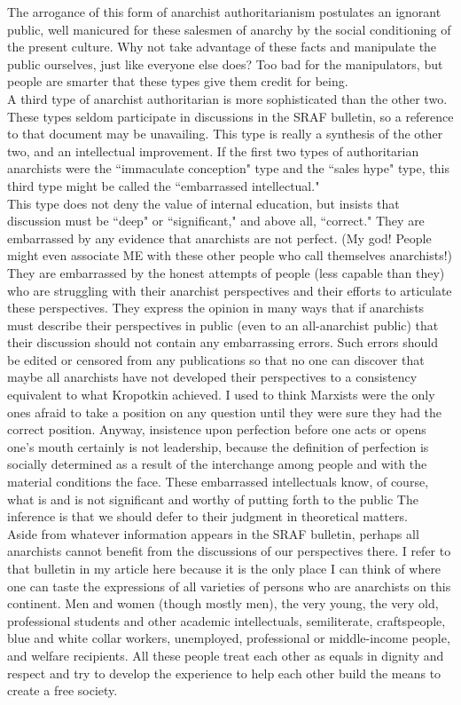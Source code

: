 The arrogance of this form of anarchist authoritarianism postulates an ignorant public, well manicured for these salesmen of anarchy by the social conditioning of the present culture. Why not take advantage of these facts and manipulate the public ourselves, just like everyone else does? Too bad for the manipulators, but people are smarter that these types give them credit for being.\\
A third type of anarchist authoritarian is more sophisticated than the other two. These types seldom participate in discussions in the SRAF bulletin, so a reference to that document may be unavailing. This type is really a synthesis of the other two, and an intellectual improvement. If the first two types of authoritarian anarchists were the ``immaculate conception" type and the ``sales hype" type, this third type might be called the ``embarrassed intellectual."\\
This type does not deny the value of internal education, but insists that discussion must be ``deep" or ``significant," and above all, ``correct." They are embarrassed by any evidence that anarchists are not perfect. (My god! People might even associate ME with these other people who call themselves anarchists!) They are embarrassed by the honest attempts of people (less capable than they) who are struggling with their anarchist perspectives and their efforts to articulate these perspectives. They express the opinion in many ways that if anarchists must describe their perspectives in public (even to an all-anarchist public) that their discussion should not contain any embarrassing errors. Such errors should be edited or censored from any publications so that no one can discover that maybe all anarchists have not developed their perspectives to a consistency equivalent to what Kropotkin achieved. I used to think Marxists were the only ones afraid to take a position on any question until they were sure they had the correct position. Anyway, insistence upon perfection before one acts or opens one's mouth certainly is not leadership, because the definition of perfection is socially determined as a result of the interchange among people and with the material conditions the face. These embarrassed intellectuals know, of course, what is and is not significant and worthy of putting forth to the public The inference is that we should defer to their judgment in theoretical matters.\\
Aside from whatever information appears in the SRAF bulletin, perhaps all anarchists cannot benefit from the discussions of our perspectives there. I refer to that bulletin in my article here because it is the only place I can think of where one can taste the expressions of all varieties of persons who are anarchists on this continent. Men and women (though mostly men), the very young, the very old, professional students and other academic intellectuals, semiliterate, craftspeople, blue and white collar workers, unemployed, professional or middle-income people, and welfare recipients. All these people treat each other as equals in dignity and respect and try to develop the experience to help each other build the means to create a free society.\\
